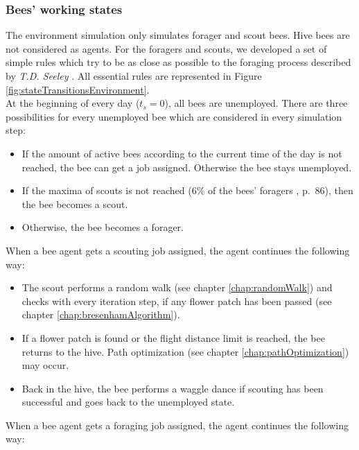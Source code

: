 		\subsubsection{Bees' working states}
			\label{chap:beesWorkingStates}
			The environment simulation only simulates forager and scout bees. Hive bees are not considered as agents. For the foragers and scouts, we developed a set of simple rules which try to be as close as possible to the foraging process described by \textit{T.D. Seeley} \cite{seeley95}. All essential rules are represented in Figure \ref{fig:stateTransitionsEnvironment}.\\
						
			At the beginning of every day ($t_s = 0$), all bees are unemployed. There are three possibilities for every unemployed bee which are considered in every simulation step:
			\begin{itemize}
				\item If the amount of active bees according to the current time of the day is not reached, the bee can get a job assigned. Otherwise the bee stays unemployed.
				\item If the maxima of scouts is not reached (6\% of the bees' foragers \cite*{seeley95}, p.~86), then the bee becomes a scout.
				\item Otherwise, the bee becomes a forager.
			\end{itemize}			
			When a bee agent gets a scouting job assigned, the agent continues the following way:
			\begin{itemize}
				\item The scout performs a random walk (see chapter \ref{chap:randomWalk}) and checks with every iteration step, if any flower patch has been passed (see chapter \ref{chap:bresenhamAlgorithm}).
				\item If a flower patch is found or the flight distance limit is reached, the bee returns to the hive. Path optimization (see chapter \ref{chap:pathOptimization}) may occur.
				\item Back in the hive, the bee performs a waggle dance if scouting has been successful and goes back to the unemployed state.
			\end{itemize}			
			When a bee agent gets a foraging job assigned, the agent continues the following way:
